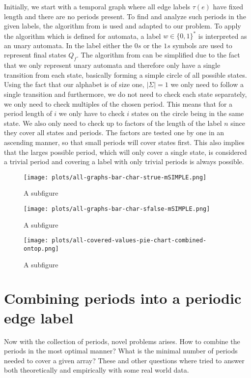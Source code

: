Initially, we start with a temporal graph where all edge labels $\tau(e)$ have fixed length and there are no periods present. To find and analyze such periods in the given labels, the algorithm from \cite{DBLP:journals/corr/abs-2107-04683} is used and adapted to our problem. To apply the algorithm which is defined for automata, a label $ w \in \{0,1\}^*$ is interpreted as an unary automata. In the label either the $0s$ or the $1s$ symbols are used to represent final states $Q_f$. The algorithm from \cite{DBLP:journals/corr/abs-2107-04683} can be simplified due to the fact that we only represent unary automata and therefore only have a single transition from each state, basically forming a simple circle of all possible states. Using the fact that our alphabet is of size one, $|\Sigma| = 1$ we only need to follow a single transition and furthermore, we do not need to check each state separately, we only need to check multiples of the chosen period. This means that for a period length of $i$ we only have to check $i$ states on the circle being in the same state. We also only need to check up to factors of the length of the label $n$ since they cover all states and periods. The factors are tested one by one in an ascending manner, so that small periods will cover states first. This also implies that the larges possible period, which will only cover a single state, is considered a trivial period and covering a label with only trivial periods is always possible.


\begin{figure}
	\texttt{[image: plots/all-graphs-bar-char-strue-mSIMPLE.png]}
	\caption{A subfigure}
	\label{fig:sub1}
\end{figure}

\begin{figure}
	\texttt{[image: plots/all-graphs-bar-char-sfalse-mSIMPLE.png]}
	\caption{A subfigure}
	\label{fig:sub1}
\end{figure}



\begin{figure}
	\texttt{[image: plots/all-covered-values-pie-chart-combined-ontop.png]}
	\caption{A subfigure}
	\label{fig:sub2}
\end{figure}



\section{Combining periods into a periodic edge label}

Now with the collection of periods, novel problems arises. How to combine the periods in the most optimal manner? What is the minimal number of periods needed to cover a given array? These and other questions where tried to answer both theoretically and empirically with some real world data.


